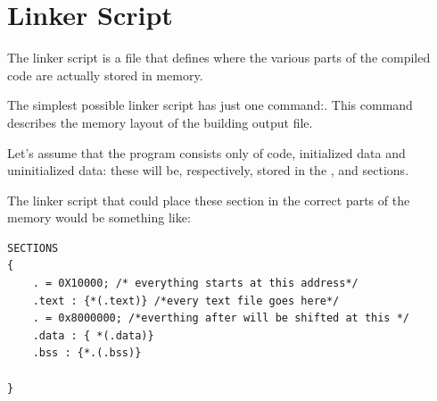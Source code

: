 \section{Linker Script}
The linker script is a file that defines where the various parts of the compiled code are actually stored in memory.

The simplest possible linker script has just one command:\code[SECTIONS]. This command describes the memory layout of the building output file.

Let's assume that the program consists only of code, initialized data and uninitialized data: these will be, respectively, stored in the ,  and  sections.

The linker script that could place these section in the correct parts of the memory would be something like:

\begin{lstlisting}
SECTIONS
{
	. = 0X10000; /* everything starts at this address*/
	.text : {*(.text)} /*every text file goes here*/ 
	. = 0x8000000; /*everthing after will be shifted at this */
	.data : { *(.data)}
	.bss : {*.(.bss)}

}

\end{lstlisting}


%	

